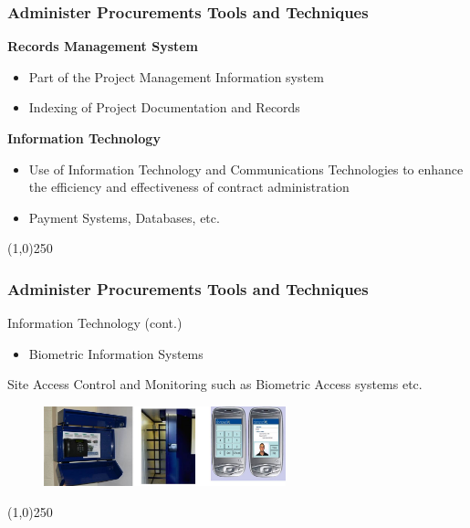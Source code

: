 \begin{frame}
\frametitle{Administer Procurements \hfill\hfill Tools and Techniques}
\textbf{Records Management System}
\begin{itemize}
	\item Part of the Project Management Information system
	\item Indexing of Project Documentation and Records
\end{itemize}
\textbf{Information Technology}
\begin{itemize}
	\item Use of Information Technology and Communications Technologies to enhance the efficiency and effectiveness of contract administration
\item Payment Systems, Databases, etc.
\end{itemize}
\end{frame}\begin{center}\line(1,0){250}\end{center}



\begin{frame}
\frametitle{Administer Procurements \hfill\hfill Tools and Techniques}

Information Technology (cont.)
\begin{itemize}
	\item Biometric Information Systems
\end{itemize}
Site Access Control and Monitoring
such as Biometric Access systems etc.

\begin{figure}
	\centering
		\includegraphics[width = 7cm]{images/donseed.jpg}
	\label{fig:donseed}
\end{figure}
\end{frame}\begin{center}\line(1,0){250}\end{center}




